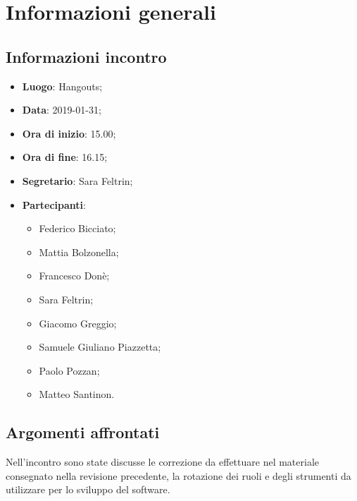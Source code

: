 \section{Informazioni generali}

\subsection{Informazioni incontro}
\begin{itemize}
\item \textbf{Luogo}: Hangouts;
\item \textbf{Data}: 2019-01-31;
\item \textbf{Ora di inizio}: 15.00;
\item \textbf{Ora di fine}: 16.15;
\item \textbf{Segretario}: Sara Feltrin;
\item \textbf{Partecipanti}: 
\begin{itemize}
	\item Federico Bicciato;
	\item Mattia Bolzonella;
	\item Francesco Donè;
	\item Sara Feltrin;
	\item Giacomo Greggio;
	\item Samuele Giuliano Piazzetta;
	\item Paolo Pozzan;
	\item Matteo Santinon.
\end{itemize}
\end{itemize}

\subsection{Argomenti affrontati}
Nell'incontro sono state discusse le correzione da effettuare nel materiale
consegnato nella revisione precedente, la rotazione dei ruoli e degli strumenti
da utilizzare per lo sviluppo del software.
